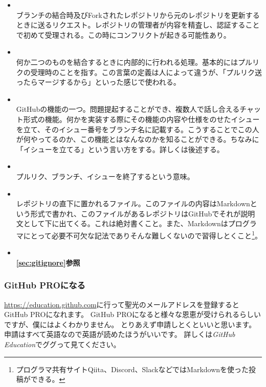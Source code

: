 \documentclass[dvipdfmx,jb5]{jarticle}
\begin{document}
\begin{itemize}
\item {}\\
ブランチの結合時及びForkされたレポジトリから元のレポジトリを更新するときに送るリクエスト。レポジトリの管理者が内容を精査し、認証することで初めて受理される。この時にコンフリクトが起きる可能性あり。
\item {}\\
何か二つのものを結合するときに内部的に行われる処理。基本的にはプルリクの受理時のことを指す。この言葉の定義は人によって違うが、「プルリク送ったらマージするから」といった感じで使われる。
\item {}\\
GitHubの機能の一つ。問題提起することができ、複数人で話し合えるチャット形式の機能。何かを実装する際にその機能の内容や仕様をのせたイシューを立て、そのイシュー番号をブランチ名に記載する。こうすることでこの人が何やってるのか、この機能とはなんなのかを知ることができる。ちなみに「イシューを立てる」という言い方をする。詳しくは後述する。
\item {}\\
プルリク、ブランチ、イシューを終了するという意味。
\item {}\\
レポジトリの直下に置かれるファイル。このファイルの内容はMarkdownという形式で書かれ、このファイルがあるレポジトリはGitHubでそれが説明文として下に出てくる。これは絶対書くこと。また、Markdownはプログラマにとって必要不可欠な記法でありそんな難しくないので習得しとくこと\footnote{プログラマ共有サイトQiita、Discord、SlackなどではMarkdownを使った投稿ができる。}。
\item {}\\
{\bf\ref{sec:gitignore}参照}
\end{itemize}


\subsubsection{GitHub PROになる}
\url{https://education.github.com}に行って聖光のメールアドレスを登録するとGitHub PROになれます。
GitHub PROになると様々な恩恵が受けられるらしいですが、僕にはよくわかりません。
とりあえず申請しとくといいと思います。
申請はすべて英語なので英語が読めたほうがいいです。
詳しくは\emph{GitHub Education}でググって見てください。
\end{document}
